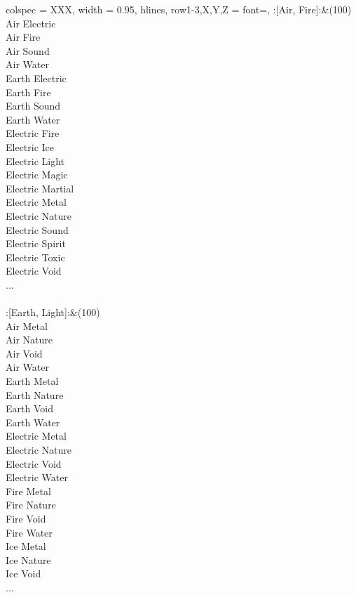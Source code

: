 \begin{longtblr}[
	caption = {2v2 Defending Weak},
	label = {2v2-Defending-Weak},
]{
	colspec = {XXX}, width = 0.95\linewidth,
	hlines,
	row{1-3,X,Y,Z} = {font=\bfseries},
}
	:[Air, Fire]:&{(100)\\
	Air Electric \\
	Air Fire \\
	Air Sound \\
	Air Water \\
	Earth Electric \\
	Earth Fire \\
	Earth Sound \\
	Earth Water \\
	Electric Fire \\
	Electric Ice \\
	Electric Light \\
	Electric Magic \\
	Electric Martial \\
	Electric Metal \\
	Electric Nature \\
	Electric Sound \\
	Electric Spirit \\
	Electric Toxic \\
	Electric Void \\
	...\\
	}\\

	:[Earth, Light]:&{(100)\\
	Air Metal \\
	Air Nature \\
	Air Void \\
	Air Water \\
	Earth Metal \\
	Earth Nature \\
	Earth Void \\
	Earth Water \\
	Electric Metal \\
	Electric Nature \\
	Electric Void \\
	Electric Water \\
	Fire Metal \\
	Fire Nature \\
	Fire Void \\
	Fire Water \\
	Ice Metal \\
	Ice Nature \\
	Ice Void \\
	...\\
	}\\


\end{longtblr}

